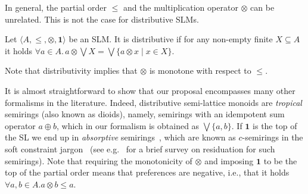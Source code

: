 \documentclass{llncs}
\def\monid{{\mathbf 0}}
\def\monop{\otimes}
\def\monid{\mathbf{1}}
\begin{document}
In general, the partial order $\leq$ and the multiplication operator $\otimes$ can be unrelated.
This is not the case for distributive SLMs.

\begin{definition}[distributivity]
\label{dist}
Let $\langle A, \leq, \monop, \monid \rangle$ be an SLM.
It is distributive if
	for  any  non-empty finite  $X \subseteq A$
		it holds $\forall a \in A.\,  a \monop  \bigvee X = \bigvee \{a \monop x \mid x \in X\}$.
\end{definition}

Note that distributivity implies that $\otimes$ is monotone with respect to $\leq$.
\begin{remark}

	It is almost straightforward to show that our proposal encompasses many other formalisms in the literature.
	Indeed, distributive semi-lattice monoids are \emph{tropical} semirings (also known as dioids), 
	namely, semirings with an idempotent sum operator $a \oplus b$, which in our formalism is obtained as
	$\bigvee \{a, b\}$.
	If $\monid$ is the top of the SL we end up 
	in \emph{absorptive} semirings~\cite{golanShort}, 
	which are known as $c$-semirings 
	in the soft constraint jargon~\cite{jacm97} (see e.g.~\cite{ecai06} for a brief survey on residuation 
	for such semirings).
	Note that requiring the monotonicity of $\otimes$ and imposing $\monid$ to be the top of the partial order
	means that preferences are negative, i.e., 
	that it holds $\forall a, b \in A. a \monop b \leq a$.
\end{remark}

%
%
%
\end{document}
